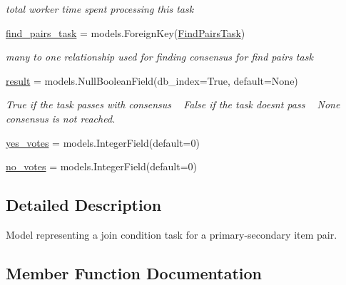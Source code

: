 \begin{DoxyCompactItemize}
\begin{DoxyCompactList}\small\item\em total worker time spent processing this task \end{DoxyCompactList}\item 
\mbox{\hyperlink{classjoinapp_1_1models_1_1task__management__models_1_1_join_pair_task_a257eaf9cfc95b681d5574cd26f284554}{find\+\_\+pairs\+\_\+task}} = models.\+Foreign\+Key(\mbox{\hyperlink{classjoinapp_1_1models_1_1task__management__models_1_1_find_pairs_task}{Find\+Pairs\+Task}})
\begin{DoxyCompactList}\small\item\em many to one relationship used for finding consensus for find pairs task \end{DoxyCompactList}\item 
\mbox{\hyperlink{classjoinapp_1_1models_1_1task__management__models_1_1_join_pair_task_a937d4dd628a8858b443a399410d2600b}{result}} = models.\+Null\+Boolean\+Field(db\+\_\+index=True, default=None)
\begin{DoxyCompactList}\small\item\em True if the task passes with consensus ~\newline
 False if the task doesn\textquotesingle{}t pass ~\newline
 None consensus is not reached. \end{DoxyCompactList}\item 
\mbox{\hyperlink{classjoinapp_1_1models_1_1task__management__models_1_1_join_pair_task_ab50f50bde4c2c1524460c48def8f27f3}{yes\+\_\+votes}} = models.\+Integer\+Field(default=0)
\item 
\mbox{\hyperlink{classjoinapp_1_1models_1_1task__management__models_1_1_join_pair_task_a1e1b32e1e9767af8d38c4e2de888919f}{no\+\_\+votes}} = models.\+Integer\+Field(default=0)
\end{DoxyCompactItemize}


\subsection{Detailed Description}
Model representing a join condition task for a primary-\/secondary item pair. 

\subsection{Member Function Documentation}
\mbox{\label{classjoinapp_1_1models_1_1task__management__models_1_1_join_pair_task_a23e8041ce1015febe4fdace3225714f9}} 
